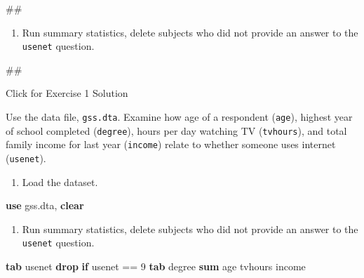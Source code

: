 \documentclass[
]{book}
\newenvironment{Shaded}{\begin{snugshade}}{\end{snugshade}}
\newcommand{\KeywordTok}[1]{\textcolor[rgb]{0.13,0.29,0.53}{\textbf{#1}}}
\newcommand{\NormalTok}[1]{#1}
\providecommand{\tightlist}{%
  \setlength{\itemsep}{0pt}\setlength{\parskip}{0pt}}
\begin{document}
\begin{Shaded}
\begin{Highlighting}[]
\NormalTok{\#\#}
\end{Highlighting}
\end{Shaded}

\begin{enumerate}
\def\labelenumi{\arabic{enumi}.}
\setcounter{enumi}{1}
\tightlist
\item
  Run summary statistics, delete subjects who did not provide an answer to the \texttt{usenet} question.
\end{enumerate}

\begin{Shaded}
\begin{Highlighting}[]
\NormalTok{\#\#}
\end{Highlighting}
\end{Shaded}

{Click for Exercise 1 Solution}

Use the data file, \texttt{gss.dta}. Examine how age of a respondent (\texttt{age}), highest year of school completed (\texttt{degree}), hours per day watching TV (\texttt{tvhours}), and total family income for last year (\texttt{income}) relate to whether someone uses internet (\texttt{usenet}).

\begin{enumerate}
\def\labelenumi{\arabic{enumi}.}
\tightlist
\item
  Load the dataset.
\end{enumerate}

\begin{Shaded}
\begin{Highlighting}[]
\KeywordTok{use}\NormalTok{ gss.dta, }\KeywordTok{clear} 
\end{Highlighting}
\end{Shaded}

\begin{enumerate}
\def\labelenumi{\arabic{enumi}.}
\setcounter{enumi}{1}
\tightlist
\item
  Run summary statistics, delete subjects who did not provide an answer to the \texttt{usenet} question.
\end{enumerate}

\begin{Shaded}
\begin{Highlighting}[]
\KeywordTok{tab}\NormalTok{ usenet }
\KeywordTok{drop} \KeywordTok{if}\NormalTok{ usenet == 9}
\KeywordTok{tab}\NormalTok{ degree }
\KeywordTok{sum}\NormalTok{ age tvhours income }
\end{Highlighting}
\end{Shaded}
\end{document}
